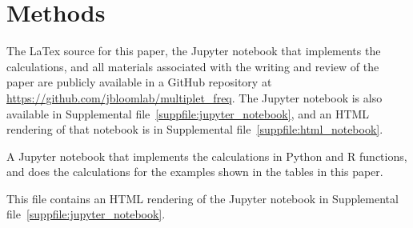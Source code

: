 \documentclass[fleqn,10pt]{wlpeerj} %
\begin{document}
\section*{Methods}
The LaTex source for this paper, the Jupyter notebook that implements the calculations, and all materials associated with the writing and review of the paper are publicly available in a GitHub repository at \url{https://github.com/jbloomlab/multiplet_freq}.
The Jupyter notebook is also available in Supplemental file~\ref{suppfile:jupyter_notebook}, and an HTML rendering of that notebook is in Supplemental file~\ref{suppfile:html_notebook}.




\clearpage

\begin{suppfile}
\caption{\label{suppfile:jupyter_notebook}
A Jupyter notebook that implements the calculations in Python and R functions, and does the calculations for the examples shown in the tables in this paper.
}
\end{suppfile}

\begin{suppfile}
\caption{\label{suppfile:html_notebook}
This file contains an HTML rendering of the Jupyter notebook in Supplemental file~\ref{suppfile:jupyter_notebook}.
}
\end{suppfile}
\end{document}

